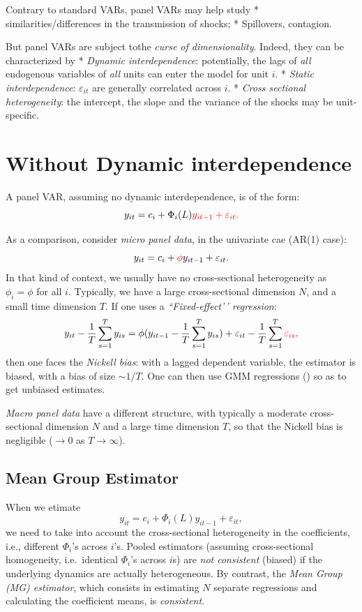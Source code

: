 \documentclass[
  12pt,
]{book}
\theoremstyle{definition}
\theoremstyle{definition}
\theoremstyle{definition}
\theoremstyle{definition}
\theoremstyle{remark}
\begin{document}
Contrary to standard VARs, panel VARs may help study
* similarities/differences in the transmission of shocks;
* Spillovers, contagion.

But panel VARs are subject tothe \emph{curse of dimensionality}. Indeed, they can be characterized by
* \emph{Dynamic interdependence}: potentially, the lags of \emph{all}
endogenous variables of \emph{all} units can enter the model for unit \(i\).
* \emph{Static interdependence}: \(\varepsilon_{it}\) are
generally correlated across \(i\).
* \emph{Cross sectional heterogeneity}: the intercept, the slope and the
variance of the shocks may be unit-specific.

\section{Without Dynamic interdependence}\label{without-dynamic-interdependence}

A panel VAR, assuming no dynamic interdependence, is of the form:
\[ y_{it}=c_i+\Phi_i(L)
\color{red}{y_{it-1}}+\varepsilon_{it}.\]

As a comparison, consider \emph{micro panel data}, in the univariate cae (AR(1) case): \[y_{it}=c_i+{\color{red}\phi} y_{it-1}+\varepsilon_{it}.\] In that kind of context, we usually have no cross-sectional heterogeneity as \(\phi_i=\phi\) for all \(i\). Typically, we have a large cross-sectional dimension \(N\), and a small time dimension \(T\). If one uses a \emph{``Fixed-effect'\,' regression}:
\[y_{it}-\frac{1}{T}\sum_{s=1}^Ty_{is}=\phi(y_{it-1}-\frac{1}{T}\sum_{s=1}^Ty_{is})+\varepsilon_{it}-\frac{1}{T}\sum_{s=1}^T\color{red}{\varepsilon_{is}},\]
then one faces the \emph{Nickell bias}: with a lagged dependent variable, the estimator is biased, with a bias of size \(\sim 1/T\). One can then use GMM regressions (\citet{Arellano_Bond_1991}) so as to get unbiased estimates.

\emph{Macro panel data} have a different structure, with typically a moderate cross-sectional dimension \(N\) and a large time dimension \(T\), so that the Nickell bias is negligible (\(\rightarrow 0\) as \(T\rightarrow\infty\)).

\subsection{Mean Group Estimator}\label{mean-group-estimator}

When we etimate
\[ y_{it}=c_i+\Phi_i(L)
y_{it-1}+\varepsilon_{it},\]
we need to take into account the cross-sectional heterogeneity in the coefficients, i.e., different \(\Phi_i\)'s across \(i\)'s.
Pooled estimators (assuming cross-sectional homogeneity, i.e.~identical \(\Phi_i\)'s across \(i\)s) are \emph{not consistent} (biased) if the underlying dynamics are actually heterogeneous. By contrast, the \emph{Mean Group (MG) estimator}, which consists in estimating \(N\) separate regressions
and calculating the coefficient means, is \emph{consistent}.
\end{document}
